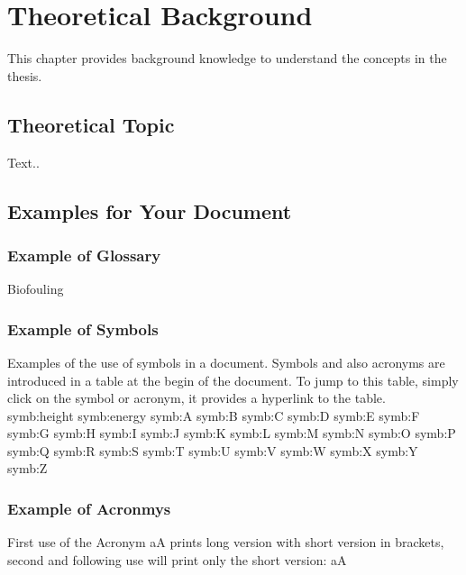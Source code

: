 \documentclass[class=scrbook, crop=false]{standalone}
\begin{document}
\ifstandalone

    
\fi

\chapter{Theoretical Background}
\label{Chapter::Theoretical_Background} %
This chapter provides background knowledge to understand the concepts in the thesis.

\section{Theoretical Topic}
\label{Section::Theoretical_Topic}
    Text..

\section{Examples for Your Document}
    
    \subsection{Example of Glossary}
    \gls{Biofouling}
    
    \subsection{Example of Symbols}
    Examples of the use of symbols in a document. Symbols and also acronyms are introduced in a table at the begin of the document. To jump to this table, simply click on the symbol or acronym, it provides a hyperlink to the table.\\
    \gls{symb:height}
    \gls{symb:energy}
    \gls{symb:A}
    \gls{symb:B}
    \gls{symb:C}
    \gls{symb:D}
    \gls{symb:E}
    \gls{symb:F}
    \gls{symb:G}
    \gls{symb:H}
    \gls{symb:I}
    \gls{symb:J}
    \gls{symb:K}
    \gls{symb:L}
    \gls{symb:M}
    \gls{symb:N}
    \gls{symb:O}
    \gls{symb:P}
    \gls{symb:Q}
    \gls{symb:R}
    \gls{symb:S}
    \gls{symb:T}
    \gls{symb:U}
    \gls{symb:V}
    \gls{symb:W}
    \gls{symb:X}
    \gls{symb:Y}
    \gls{symb:Z}
    
    \subsection{Example of Acronmys}
    First use of the Acronym \gls{aA} prints long version with short version in brackets, second and following use will print only the short version: \gls{aA}
    
\end{document}
